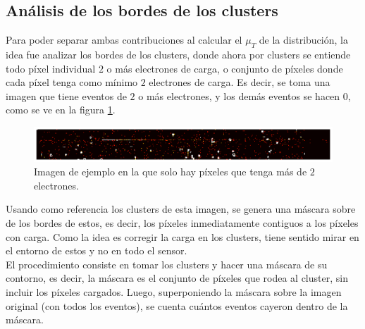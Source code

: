 \subsection{Análisis de los bordes de los clusters}
\noindent Para poder separar ambas contribuciones al calcular el $\mu_{T}$ de la distribución, la idea fue analizar los bordes de los clusters, donde ahora por clusters se entiende todo píxel individual $2$ o más electrones de carga, o conjunto de píxeles donde cada píxel tenga como mínimo $2$ electrones de carga. Es decir, se toma una imagen que tiene eventos de $2$ o más electrones, y los demás eventos se hacen $0$, como se ve en la figura \ref{fig:ImagenFits2omasElectrones}.
\begin{figure}[h]
    \centering
    \includegraphics[scale=0.4]{Figs/imagen_fits_2_o_mas.pdf}
    \caption{\footnotesize{Imagen de ejemplo en la que solo hay píxeles que tenga más de $2$ electrones.}}
    \label{fig:ImagenFits2omasElectrones}
\end{figure}
Usando como referencia los clusters de esta imagen, se genera una máscara sobre de los bordes de estos, es decir, los píxeles inmediatamente contiguos a los píxeles con carga. Como la idea es corregir la carga en los clusters, tiene sentido mirar en el entorno de estos y no en todo el sensor.\\
\indent El procedimiento consiste en tomar los clusters y hacer una máscara de su contorno, es decir, la máscara es el conjunto de píxeles que rodea al cluster, sin incluir los píxeles cargados. Luego, superponiendo la máscara sobre la imagen original (con todos los eventos), se cuenta cuántos eventos cayeron dentro de la máscara. 
